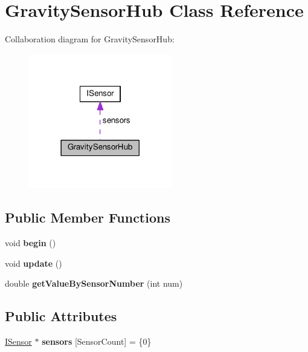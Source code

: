 \hypertarget{class_gravity_sensor_hub}{}\section{Gravity\+Sensor\+Hub Class Reference}
\label{class_gravity_sensor_hub}


Collaboration diagram for Gravity\+Sensor\+Hub\+:\nopagebreak
\begin{figure}[H]
\begin{center}
\leavevmode
\includegraphics[width=177pt]{class_gravity_sensor_hub__coll__graph}
\end{center}
\end{figure}
\subsection*{Public Member Functions}
\begin{DoxyCompactItemize}
\item 
void {\bfseries begin} ()\hypertarget{class_gravity_sensor_hub_ad6e158e956ebaea865c5508b2f0fbacc}{}\label{class_gravity_sensor_hub_ad6e158e956ebaea865c5508b2f0fbacc}

\item 
void {\bfseries update} ()\hypertarget{class_gravity_sensor_hub_a5b253e5452c4860926b694922fc987f7}{}\label{class_gravity_sensor_hub_a5b253e5452c4860926b694922fc987f7}

\item 
double {\bfseries get\+Value\+By\+Sensor\+Number} (int num)\hypertarget{class_gravity_sensor_hub_a12fdc4fb6e3ec36d16fd92ae448ccc5d}{}\label{class_gravity_sensor_hub_a12fdc4fb6e3ec36d16fd92ae448ccc5d}

\end{DoxyCompactItemize}
\subsection*{Public Attributes}
\begin{DoxyCompactItemize}
\item 
\hyperlink{class_i_sensor}{I\+Sensor} $\ast$ {\bfseries sensors} \mbox{[}Sensor\+Count\mbox{]} = \{0\}\hypertarget{class_gravity_sensor_hub_ae7bd459a1ca0eb6b2ac748f7c288a7d0}{}\label{class_gravity_sensor_hub_ae7bd459a1ca0eb6b2ac748f7c288a7d0}

\end{DoxyCompactItemize}


